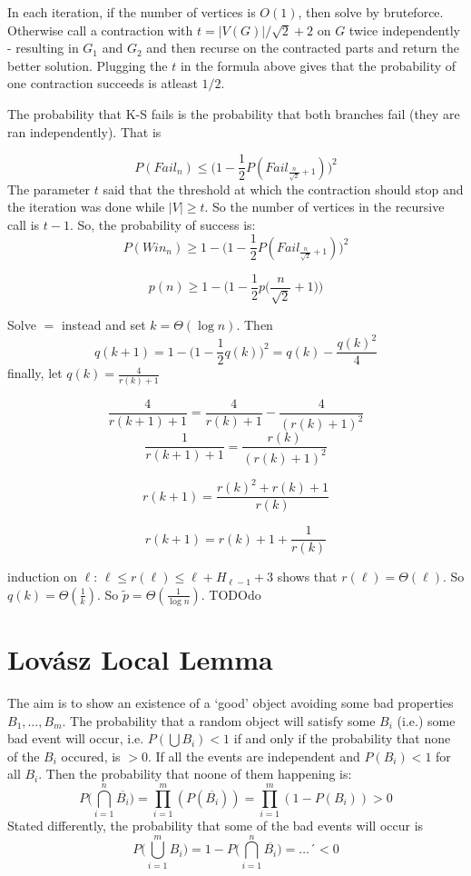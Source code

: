 \documentclass{article}
\theoremstyle{plain}
\theoremstyle{definition}
\begin{document}
In each iteration, if the number of vertices is $O(1)$, then solve by bruteforce. Otherwise call a contraction with $t=|V(G)|/\sqrt{2}+2$ on $G$ twice independently - resulting in $G_1$ and $G_2$ and then recurse on the contracted parts and return the better solution. Plugging the $t$ in the formula above gives that the probability of one contraction succeeds is atleast $1/2$. 

The probability that K-S fails is the probability that both branches fail (they are ran independently). That is

$$P(Fail_{n}) \leq  \bigg(1-\frac{1}{2}P(Fail_{\frac{n}{\sqrt{2}}+1})\bigg)^2$$
The parameter $t$ said that the threshold at which the contraction should stop and the iteration was done while $|V|\geq t$. So the number of vertices in the recursive call is $t-1$. So, the probability of success is:
$$
P(Win_{n})\geq 1 - \bigg(1-\frac{1}{2}P(Fail_{\frac{n}{\sqrt{2}}+1})\bigg)^2
$$

$$p(n)\geq 1 -\bigg(1-\frac{1}{2}p\bigg(\frac{n}{\sqrt{2}}+1\bigg)\bigg)$$

Solve $=$ instead and set $k=\Theta(\log n)$. Then
$$
q(k+1)=1-\bigg(1-\frac{1}{2}q(k)\bigg)^2=q(k)-\frac{q(k)^2}{4}
$$
finally, let $q(k)=\frac{4}{r(k)+1}$

$$
\frac{4}{r(k+1)+1}=\frac{4}{r(k)+1}-\frac{4}{(r(k)+1)^2}
$$
$$
\frac{1}{r(k+1)+1}=\frac{r(k)}{(r(k)+1)^2}
$$

$$
r(k+1)=\frac{r(k)^2+r(k)+1}{r(k)}
$$

$$
r(k+1)=r(k)+1+\frac{1}{r(k)}
$$

induction on $\ell$:
$\ell\leq r(\ell)\leq \ell + H_{\ell - 1} + 3$
shows that $r(\ell)=\Theta(\ell)$. So $q(k)=\Theta(\frac{1}{k})$. So $\tilde{p}=\Theta(\frac{1}{\log n})$.
TODOdo


\section{Lovász Local Lemma}
The aim is to show an existence of a `good' object avoiding some bad properties $B_1,\ldots, B_m$. The probability that a random object will satisfy some $B_i$ (i.e.) some bad event will occur, i.e. $P(\bigcup B_i) < 1$ if and only if the probability that none of the $B_i$ occured, is $>0$. If all the events are independent and $P(B_i)<1$ for all $B_i$. Then the probability that noone of them happening is:
$$
P\bigg(\bigcap_{i=1}^n \overline{B_i}\bigg)= \prod_{i=1}^m (P(\overline{B_i}))=\prod_{i=1}^m(1-P(B_i)) > 0
$$
Stated differently, the probability that some of the bad events will occur is
$$
P\bigg(\bigcup_{i=1}^mB_i\bigg)= 1 - P\bigg(\bigcap_{i=1}^n \overline{B_i}\bigg) =\ldots´ < 0
$$
\end{document}
